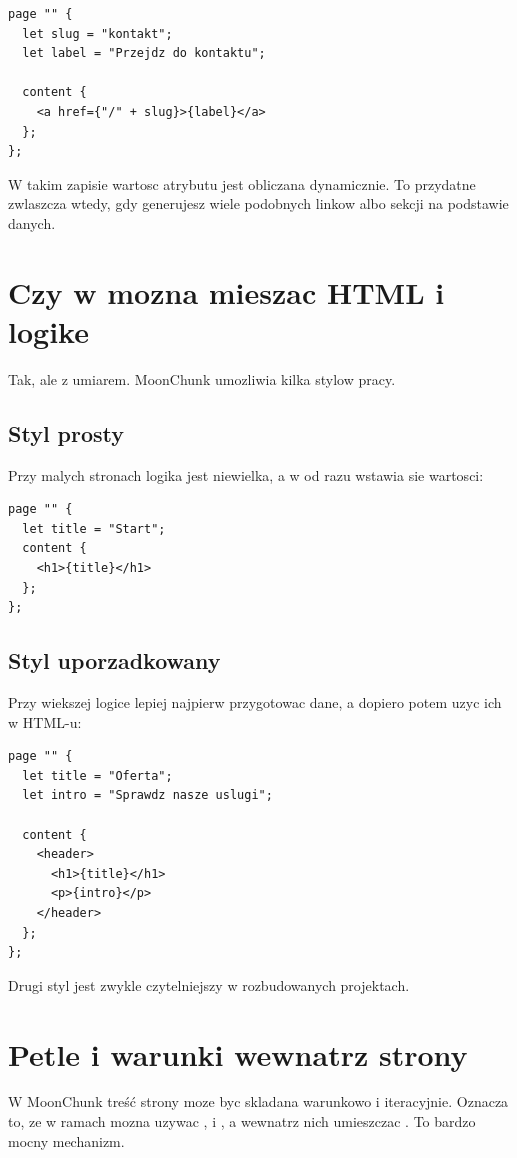 \begin{lstlisting}[style=moonchunk,caption={Dynamiczny atrybut HTML}]
page "" {
  let slug = "kontakt";
  let label = "Przejdz do kontaktu";

  content {
    <a href={"/" + slug}>{label}</a>
  };
};
\end{lstlisting}

W takim zapisie wartosc atrybutu  jest obliczana dynamicznie. To przydatne
zwlaszcza wtedy, gdy generujesz wiele podobnych linkow albo sekcji na podstawie danych.

\section{Czy w  mozna mieszac HTML i logike}
Tak, ale z umiarem. MoonChunk umozliwia kilka stylow pracy.

\subsection*{Styl prosty}
Przy malych stronach logika jest niewielka, a w  od razu wstawia sie wartosci:

\begin{lstlisting}[style=moonchunk,caption={Prosty styl budowy strony}]
page "" {
  let title = "Start";
  content {
    <h1>{title}</h1>
  };
};
\end{lstlisting}

\subsection*{Styl uporzadkowany}
Przy wiekszej logice lepiej najpierw przygotowac dane, a dopiero potem uzyc ich w HTML-u:

\begin{lstlisting}[style=moonchunk,caption={Najpierw logika, potem HTML}]
page "" {
  let title = "Oferta";
  let intro = "Sprawdz nasze uslugi";

  content {
    <header>
      <h1>{title}</h1>
      <p>{intro}</p>
    </header>
  };
};
\end{lstlisting}

Drugi styl jest zwykle czytelniejszy w rozbudowanych projektach.

\section{Petle i warunki wewnatrz strony}
W MoonChunk treść strony moze byc skladana warunkowo i iteracyjnie. Oznacza to, ze
w ramach  mozna uzywac ,  i , a wewnatrz nich
umieszczac . To bardzo mocny mechanizm.

